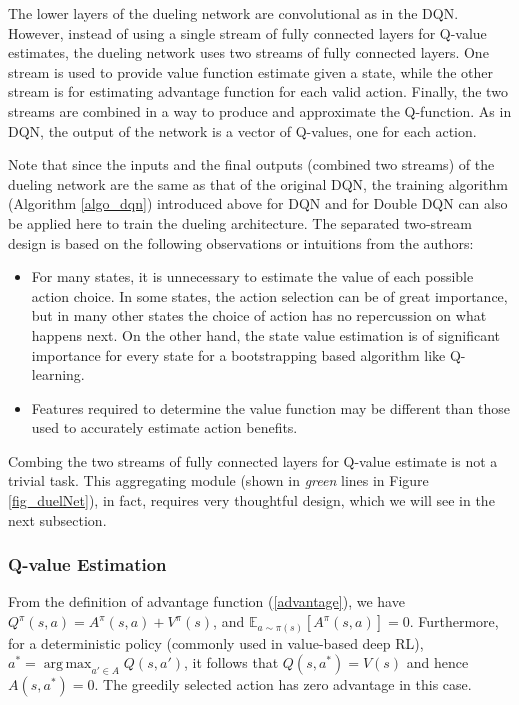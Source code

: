 \documentclass{article}
\newcommand{\E}{\mathbb{E}}                                        %
\DeclareMathOperator*{\argmax}{arg\,max}
\begin{document}
The lower layers of the dueling network are convolutional as in the DQN. However, instead of using a single stream of fully connected layers for Q-value estimates, the dueling network uses two streams of fully connected layers. One stream is used to provide value function estimate given a state, while the other stream is for estimating advantage function for each valid action. Finally, the two streams are combined in a way to produce and approximate the Q-function. As in DQN, the output of the network is a vector of Q-values, one for each action.

Note that since the inputs and the final outputs (combined two streams) of the dueling network are the same as that of the original DQN, the training algorithm (Algorithm \ref{algo_dqn}) introduced above for DQN and for Double DQN can also be applied here to train the dueling architecture. The separated two-stream design is based on the following observations or intuitions from the authors:
\begin{itemize}
\item
For many states, it is unnecessary to estimate the value of each possible action choice. In some states, the action selection can be of great importance, but in many other states the choice of action has no repercussion on what happens next. On the other hand, the state value estimation is of significant importance for every state for a bootstrapping based algorithm like Q-learning.
\item
Features required to determine the value function may be different than those used to accurately estimate action benefits.
\end{itemize}

Combing the two streams of fully connected layers for Q-value estimate is not a trivial task. This aggregating module (shown in \textit{green} lines in Figure \ref{fig_duelNet}), in fact, requires very thoughtful design, which we will see in the next subsection.

\subsubsection{Q-value Estimation}
From the definition of advantage function (\ref{advantage}), we have $Q^{\pi} (s,a) = A^{\pi}(s,a) + V^\pi (s)$, and $\E_{a \sim \pi(s)} [A^{\pi}(s,a)] = 0$. Furthermore, for a deterministic policy (commonly used in value-based deep RL), $a^* = \argmax_{a' \in A} Q(s,a')$, it follows that $Q(s,a^*) = V(s)$ and hence $A(s,a^*) = 0$. The greedily selected action has zero advantage in this case.
\end{document}
